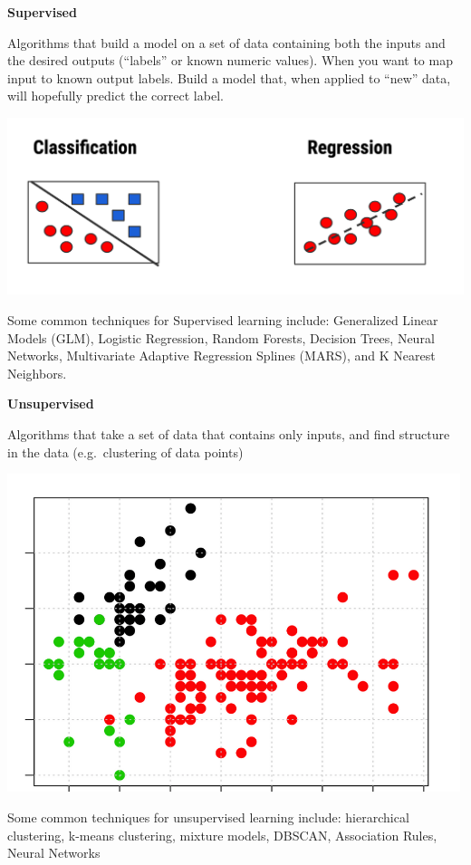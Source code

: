 \documentclass[
]{book}
\begin{document}
\textbf{Supervised}

Algorithms that build a model on a set of data containing both the inputs and the desired outputs (``labels'' or known numeric values). When you want to map input to known output labels. Build a model that, when applied to ``new'' data, will hopefully predict the correct label.

\includegraphics{./PICS/super_class_regress.png}

Some common techniques for Supervised learning include: Generalized Linear Models (GLM),
Logistic Regression, Random Forests, Decision Trees, Neural Networks, Multivariate Adaptive Regression Splines (MARS), and K Nearest Neighbors.

\textbf{Unsupervised}

Algorithms that take a set of data that contains only inputs, and find structure in the data (e.g.~clustering of data points)

\includegraphics[width=5.20833in,height=\textheight]{./PICS/unsupervised_class.png}

Some common techniques for unsupervised learning include: hierarchical clustering, k-means
clustering, mixture models, DBSCAN, Association Rules, Neural Networks
\end{document}
